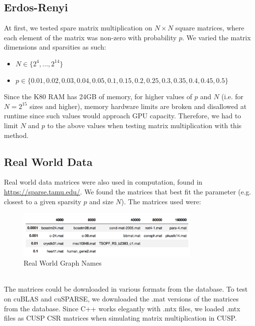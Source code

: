 \documentclass[12pt]{article}
\begin{document}
\subsection{Erdos-Renyi}
\hspace{0.5cm}At first, we tested spare matrix multiplication on $N \times N$ square matrices, where each element of the matrix was non-zero with probability $p$. We varied the matrix dimensions and sparsities as such: 
\begin{itemize} \item $N \in \{2^{4},...,2^{14} \}$ \item $p \in \{0.01, 0.02, 0.03, 0.04, 0.05, 0.1, 0.15, 0.2, 0.25, 0.3, 0.35, 0.4, 0.45, 0.5\}$
\end{itemize}
\hspace{0.5cm}Since the K80 RAM has 24GB of memory, for higher values of $p$ and $N$ (i.e. for $N = 2^{15}$ sizes and higher), memory hardware limits are broken and disallowed at runtime since such values would approach GPU capacity. Therefore, we had to limit $N$ and $p$ to the above values when testing matrix multiplication with this method.  



\subsection{Real World Data}
\hspace{0.5cm}Real world data matrices were also used in computation, found in \url{https://sparse.tamu.edu/}. We found the matrices that best fit the parameter (e.g. closest to a given sparsity $p$ and size $N$). The matrices used were:
\begin{figure}[h]
  \caption{Real World Graph Names}
  \centering 
  \includegraphics[width = 0.8\textwidth]{matrix_names.png}
\end{figure}\\
\hspace{0.5cm}The matrices could be downloaded in various formats from the database. To test on cuBLAS and cuSPARSE, we downloaded the .mat versions of the matrices from the database. Since C++ works elegantly with .mtx files, we loaded .mtx files as CUSP CSR matrices when simulating matrix multiplication in CUSP.
\end{document}
